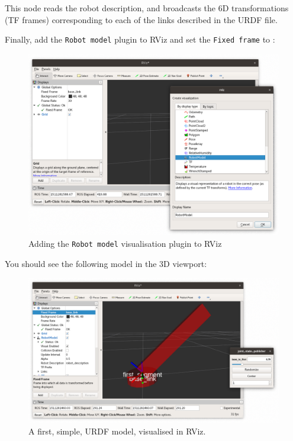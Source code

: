 \documentclass{instructions}
\begin{document}
This node reads the robot description, and broadcasts the 6D transformations (TF
frames) corresponding to each of the links described in the URDF file.

Finally, add the \texttt{Robot model} plugin to RViz and set the \texttt{Fixed
frame} to :


\begin{figure}[h!]
    \centering
    \includegraphics[width=0.9\linewidth]{rviz-plugins}
    \caption{Adding the \texttt{Robot model} visualisation plugin to RViz}
    \label{}
\end{figure}

You should see the following model in the 3D viewport:

\begin{figure}[h!]
    \centering
    \includegraphics[width=0.9\linewidth]{urdf-rviz}
    \caption{A first, simple, URDF model, visualised in RViz.}
    \label{}
\end{figure}


\end{document}
